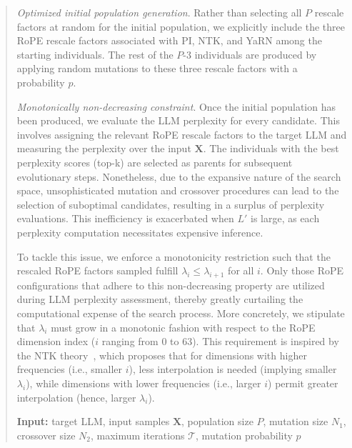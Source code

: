 \begin{abstract}
\textit{Optimized initial population generation}. Rather than selecting all $P$ rescale factors at random for the initial population, we explicitly include the three RoPE rescale factors associated with PI, NTK, and YaRN among the starting individuals. The rest of the $P$-3 individuals are produced by applying random mutations to these three rescale factors with a probability $p$.

\textit{Monotonically non-decreasing constraint}. Once the initial population has been produced, we evaluate the LLM perplexity for every candidate. This involves assigning the relevant RoPE rescale factors to the target LLM and measuring the perplexity over the input $\mathbf{X}$. The individuals with the best perplexity scores (top-k) are selected as parents for subsequent evolutionary steps. Nonetheless, due to the expansive nature of the search space, unsophisticated mutation and crossover procedures can lead to the selection of suboptimal candidates, resulting in a surplus of perplexity evaluations. This inefficiency is exacerbated when $L'$ is large, as each perplexity computation necessitates expensive inference.

To tackle this issue, we enforce a monotonicity restriction such that the rescaled RoPE factors sampled fulfill $\lambda_i \le \lambda_{i+1}$ for all $i$. Only those RoPE configurations that adhere to this non-decreasing property are utilized during LLM perplexity assessment, thereby greatly curtailing the computational expense of the search process. More concretely, we stipulate that $\lambda_i$ must grow in a monotonic fashion with respect to the RoPE dimension index ($i$ ranging from 0 to 63). This requirement is inspired by the NTK theory~\cite{jacot2018neural,tancik2020fourier,ntk}, which proposes that for dimensions with higher frequencies (i.e., smaller $i$), less interpolation is needed (implying smaller $\lambda_i$), while dimensions with lower frequencies (i.e., larger $i$) permit greater interpolation (hence, larger $\lambda_i$).

\begin{algorithm}[t]
	\small
	\caption{The search algorithm}
	\textbf{Input:} target LLM, input samples $\mathbf{X}$, population size $P$, mutation size $N_1$, crossover size $N_2$, maximum iterations $\mathcal{T}$, mutation probability $p$\\


\end{algorithm}
\end{abstract}

